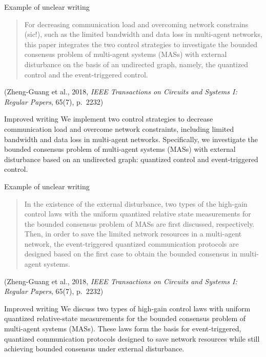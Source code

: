 \documentclass[aspectratio=169]{beamer}
\begin{document}
\begin{frame}{Example of unclear writing}
\small
\begin{quote}
For decreasing communication load and overcoming network constrains (sic!), such as
the limited bandwidth and data loss in multi-agent networks, this paper integrates the
two control strategies to investigate the bounded consensus problem of multi-agent
systems (MASs) with external disturbance on the basis of an undirected graph, namely,
the quantized control and the event-triggered control.
\end{quote}

\footnotesize
(Zheng-Guang et al., 2018, \emph{IEEE Transactions on Circuits and Systems I: Regular Papers},
65(7), p.\ 2232)
\end{frame}


\begin{frame}{Improved writing}
\small
We implement two control strategies to decrease communication load and overcome network
constraints, including limited bandwidth and data loss in multi-agent networks.
Specifically, we investigate the bounded consensus problem of multi-agent systems (MASs)
with external disturbance based on an undirected graph: quantized control and event-triggered control.
\end{frame}


\begin{frame}{Example of unclear writing}
\small
\begin{quote}
In the existence of the external disturbance, two types of the high-gain control laws with the uniform
quantized relative state measurements for the bounded consensus problem of MASs are first discussed,
respectively. Then, in order to save the limited network resources in a multi-agent network, the
event-triggered quantized communication protocols are designed based on the first case to obtain the
bounded consensus in multi-agent systems.
\end{quote}

\footnotesize
(Zheng-Guang et al., 2018, \emph{IEEE Transactions on Circuits and Systems I: Regular Papers},
65(7), p.\ 2232)
\end{frame}


\begin{frame}{Improved writing}
\small
We discuss two types of high-gain control laws with uniform quantized relative-state measurements
for the bounded consensus problem of multi-agent systems (MASs). These laws form the basis for
event-triggered, quantized communication protocols designed to save network resources while still
achieving bounded consensus under external disturbance.
\end{frame}
\end{document}
